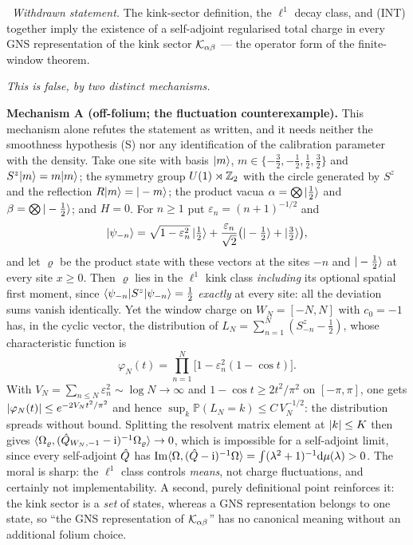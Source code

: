 \begin{refutedclaim}
\label{ref:la-strong}
\statusRefuted\
\emph{Withdrawn statement.} The kink-sector definition, the $\ell^1$
decay class, and (INT) together imply the existence of a self-adjoint
regularised total charge in every GNS representation of the kink sector
$\mathcal{K}_{\alpha\beta}$ --- the operator form of the finite-window theorem.

\emph{This is false, by two distinct mechanisms.}

\medskip\noindent\textbf{Mechanism A (off-folium; the fluctuation
counterexample).} This mechanism alone refutes the statement as written, and
it needs neither the smoothness hypothesis (S) nor any identification of the
calibration parameter with the density. Take one site with basis $|m\rangle$,
$m\in\{-\tfrac32,-\tfrac12,\tfrac12,\tfrac32\}$ and $S^z|m\rangle=m|m\rangle$; the
symmetry group $U(1)\rtimes\mathbb{Z}_2$ with the circle generated by $S^z$ and the
reflection $R|m\rangle=|-m\rangle$; the product vacua
$\alpha=\bigotimes|\tfrac12\rangle$ and $\beta=\bigotimes|-\tfrac12\rangle$; and
$H=0$. For $n\ge1$ put $\varepsilon_n=(n+1)^{-1/2}$ and
\begin{equation}
  |\psi_{-n}\rangle=\sqrt{1-\varepsilon_n^{2}}\,|\tfrac12\rangle
    +\frac{\varepsilon_n}{\sqrt2}
      \bigl(|-\tfrac12\rangle+|\tfrac32\rangle\bigr),
  \label{eq:ce-vector}
\end{equation}
and let $\varrho$ be the product state with these vectors at the sites
$-n$ and $|-\tfrac12\rangle$ at every site $x\ge0$. Then $\varrho$ lies in the
$\ell^1$ kink class \emph{including} its optional spatial first moment, since
$\langle \psi_{-n}|S^z|\psi_{-n}\rangle=\tfrac12$ \emph{exactly} at every site: all
the deviation sums vanish identically. Yet the window charge on
$W_N=[-N,N]$ with $c_0=-1$ has, in the cyclic vector, the distribution of
$L_N=\sum_{n=1}^{N}(S^z_{-n}-\tfrac12)$, whose characteristic function is
\begin{equation}
  \varphi_N(t)=\prod_{n=1}^{N}\bigl[1-\varepsilon_n^{2}(1-\cos t)\bigr].
  \label{eq:ce-charfun}
\end{equation}
With $V_N=\sum_{n\le N}\varepsilon_n^{2}\sim\log N\to\infty$ and
$1-\cos t\ge 2t^2/\pi^2$ on $[-\pi,\pi]$, one gets
$\lvert \varphi_N(t)\rvert\le e^{-2V_Nt^{2}/\pi^{2}}$ and hence
$\sup_k \mathbb{P}(L_N=k)\le C\,V_N^{-1/2}$: the distribution spreads without
bound. Splitting the resolvent matrix element at $\lvert k\rvert\le K$ then gives
$\langle \Omega_\varrho,(\hat{Q}_{W_N,-1}-\mathrm{i})^{-1}\Omega_\varrho\rangle\to0$,
which is impossible for a self-adjoint limit, since every self-adjoint
$\hat{Q}$ has
$\operatorname{Im}\langle \Omega,(\hat{Q}-\mathrm{i})^{-1}\Omega\rangle
 =\int(\lambda^{2}+1)^{-1}\mathrm{d}\mu(\lambda)>0$. The moral is sharp: the
$\ell^1$ class controls \emph{means}, not charge fluctuations, and certainly
not implementability. A second, purely definitional point reinforces it: the
kink sector is a \emph{set} of states, whereas a GNS representation belongs to
one state, so ``the GNS representation of $\mathcal{K}_{\alpha\beta}$'' has no
canonical meaning without an additional folium choice.


\end{refutedclaim}
